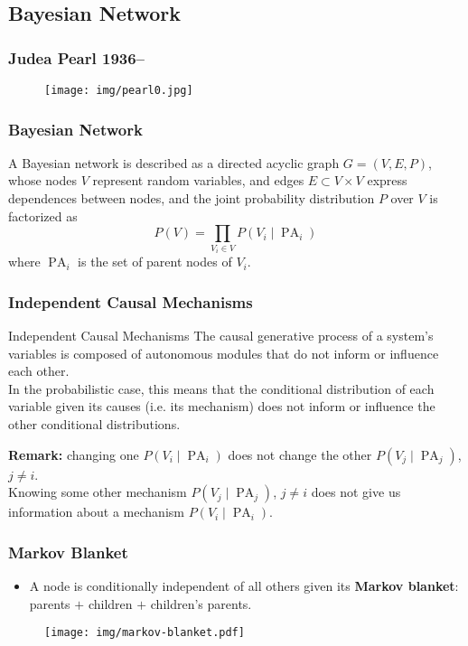 \documentclass[UTF8,11pt,colorlinks,compress,openany]{beamer}%
\begin{document}
\subsection{Bayesian Network}

\begin{frame}\frametitle{Judea Pearl 1936--}
\begin{figure}[H]
\texttt{[image: img/pearl0.jpg]}	
\end{figure}
\end{frame}

\begin{frame}\frametitle{Bayesian Network}
\begin{definition}
A Bayesian network is described as a directed acyclic graph $G = (V,E,P)$, whose nodes $V$ represent random variables, and edges $E\subset V\times V$ express dependences between nodes, and the joint probability distribution $P$ over $V$ is factorized as
\[P(V)=\prod\limits_{V_i\in V}P(V_i\mid\operatorname{PA}_i)\]
where $\operatorname{PA}_i$ is the set of parent nodes of $V_i$.
\end{definition}
\end{frame}

\begin{frame}\frametitle{Independent Causal Mechanisms}
\begin{block}{Independent Causal Mechanisms}
The causal generative process of a system's variables is composed of autonomous modules that do not inform or influence each other.\\
In the probabilistic case, this means that the conditional distribution of each variable given its causes (i.e. its mechanism) does not inform or influence the other conditional distributions.
\end{block}
\textbf{Remark:} changing one $P(V_i\mid\operatorname{PA}_i)$ does not change the other $P(V_j\mid\operatorname{PA}_j)$, $j\ne i$.\\
Knowing some other mechanism $P(V_j\mid\operatorname{PA}_j)$, $j\ne i$ does not give us information about a mechanism $P(V_i\mid\operatorname{PA}_i)$.
\end{frame}

\begin{frame}\frametitle{Markov Blanket}
\begin{itemize}
	\item A node is conditionally independent of all others given its \textbf{Markov blanket}: parents $+$ children $+$ children's parents.
\end{itemize}
\begin{figure}[H]
\texttt{[image: img/markov-blanket.pdf]}
\end{figure}
\end{frame}
\end{document}
